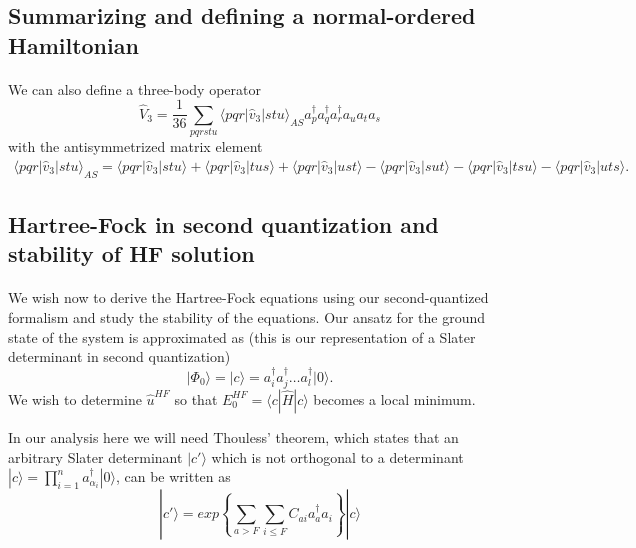 \documentclass[%
twoside,                 %
final,                   %
10pt]{article}
\begin{document}
\subsection*{Summarizing and defining a normal-ordered Hamiltonian}

\paragraph{}
We can also define a three-body operator
\[
\hat{V}_3 = \frac{1}{36} \sum_{pqrstu} \langle pqr|\hat{v}_3|stu\rangle_{AS} 
                a_p^\dagger a_q^\dagger a_r^\dagger a_u a_t a_s
\]
with the antisymmetrized matrix element
\begin{align}
            \langle pqr|\hat{v}_3|stu\rangle_{AS} = \langle pqr|\hat{v}_3|stu\rangle + \langle pqr|\hat{v}_3|tus\rangle + \langle pqr|\hat{v}_3|ust\rangle- \langle pqr|\hat{v}_3|sut\rangle - \langle pqr|\hat{v}_3|tsu\rangle - \langle pqr|\hat{v}_3|uts\rangle.
\end{align}



\subsection*{Hartree-Fock in second quantization and stability of HF solution}

\paragraph{}
We wish now to derive the Hartree-Fock equations using our second-quantized formalism and study the stability of the equations. 
Our ansatz for the ground state of the system is approximated as (this is our representation of a Slater determinant in second quantization)
\[   
|\Phi_0\rangle = |c\rangle = a^{\dagger}_i a^{\dagger}_j \dots a^{\dagger}_l|0\rangle.
\]
We wish to determine $\hat{u}^{HF}$ so that 
$E_0^{HF}= \langle c|\hat{H}| c\rangle$ becomes a local minimum. 

In our analysis here we will need Thouless' theorem, which states that
an arbitrary Slater determinant $|c'\rangle$ which is not orthogonal to a determinant
$| c\rangle ={\displaystyle\prod_{i=1}^{n}}
a_{\alpha_{i}}^{\dagger}|0\rangle$, can be written as
\[
|c'\rangle=exp\left\{\sum_{a>F}\sum_{i\le F}C_{ai}a_{a}^{\dagger}a_{i}\right\}| c\rangle 
\]
\end{document}
